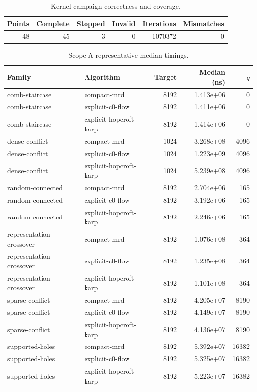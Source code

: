 \begin{table}[t]
\caption{Kernel campaign correctness and coverage.}
\label{tab:kernel-coverage}
\begin{tabular}{rrrrrr}
\toprule
Points & Complete & Stopped & Invalid & Iterations & Mismatches \\
\midrule
48 & 45 & 3 & 0 & 1070372 & 0 \\
\bottomrule
\end{tabular}
\end{table}

\begin{table}[t]
\caption{Scope A representative median timings.}
\label{tab:kernel-scope-a}
\begin{tabular}{llrrr}
\toprule
Family & Algorithm & Target & Median (ns) & $q$ \\
\midrule
comb-staircase & compact-mrd & 8192 & 1.413e+06 & 0 \\
comb-staircase & explicit-c0-flow & 8192 & 1.411e+06 & 0 \\
comb-staircase & explicit-hopcroft-karp & 8192 & 1.414e+06 & 0 \\
dense-conflict & compact-mrd & 1024 & 3.268e+08 & 4096 \\
dense-conflict & explicit-c0-flow & 1024 & 1.223e+09 & 4096 \\
dense-conflict & explicit-hopcroft-karp & 1024 & 5.239e+08 & 4096 \\
random-connected & compact-mrd & 8192 & 2.704e+06 & 165 \\
random-connected & explicit-c0-flow & 8192 & 3.192e+06 & 165 \\
random-connected & explicit-hopcroft-karp & 8192 & 2.246e+06 & 165 \\
representation-crossover & compact-mrd & 8192 & 1.076e+08 & 364 \\
representation-crossover & explicit-c0-flow & 8192 & 1.235e+08 & 364 \\
representation-crossover & explicit-hopcroft-karp & 8192 & 1.101e+08 & 364 \\
sparse-conflict & compact-mrd & 8192 & 4.205e+07 & 8190 \\
sparse-conflict & explicit-c0-flow & 8192 & 4.149e+07 & 8190 \\
sparse-conflict & explicit-hopcroft-karp & 8192 & 4.136e+07 & 8190 \\
supported-holes & compact-mrd & 8192 & 5.392e+07 & 16382 \\
supported-holes & explicit-c0-flow & 8192 & 5.325e+07 & 16382 \\
supported-holes & explicit-hopcroft-karp & 8192 & 5.223e+07 & 16382 \\
\bottomrule
\end{tabular}
\end{table}

